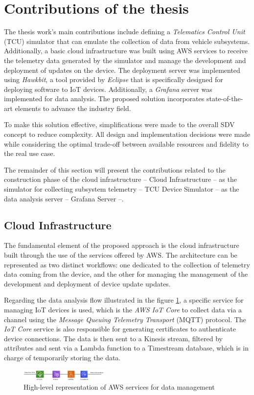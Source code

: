 \documentclass[10pt,a4paper,roman, twocolumn]{article}
\begin{document}
\section{Contributions of the thesis}
The thesis work's main contributions include defining a \textit{Telematics Control Unit} (TCU) simulator that can emulate the collection of data from vehicle subsystems. Additionally, a basic cloud infrastructure was built using AWS services to receive the telemetry data generated by the simulator and manage the development and deployment of updates on the device. The deployment server was implemented using \textit{Hawkbit}, a tool provided by \textit{Eclipse} that is specifically designed for deploying software to IoT devices. Additionally, a \textit{Grafana} server was implemented for data analysis. The proposed solution incorporates state-of-the-art elements to advance the industry field.

To make this solution effective, simplifications were made to the overall SDV concept to reduce complexity. All design and implementation decisions were made while considering the optimal trade-off between available resources and fidelity to the real use case.

The remainder of this section will present the contributions related to the construction phase of the cloud infrastructure -- Cloud Infrastructure -- as the simulator for collecting subsystem telemetry -- TCU Device Simulator -- as the data analysis server -- Grafana Server --. 

\subsection{Cloud Infrastructure}
The fundamental element of the proposed approach is the cloud infrastructure built through the use of the services offered by AWS. The architecture can be represented as two distinct workflows: one dedicated to the collection of telemetry data coming from the device, and the other for managing the management of the development and deployment of device update updates.

Regarding the data analysis flow illustrated in the figure \ref{fig:AWSDataServices}, a specific service for managing IoT devices is used, which is the \textit{AWS IoT Core} to collect data via a channel using the \textit{Message Queuing Telemetry Transport} (MQTT) protocol. The \textit{IoT Core} service is also responsible for generating certificates to authenticate device connections. The data is then sent to a Kinesis stream, filtered by attributes and sent via a Lambda function to a Timestream database, which is in charge of temporarily storing the data.
\begin{figure} [tbh]
	\centerline{\includegraphics[width=0.4\textwidth]{images/AWS_data_services.png}}
	\caption{High-level representation of AWS services for data management}
	\label{fig:AWSDataServices}
\end{figure}
\end{document}
